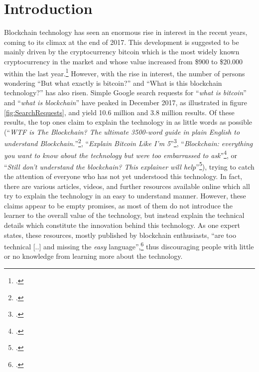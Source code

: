 \chapter{Introduction}
\label{chapter:Intro}

Blockchain technology has seen an enormous rise in interest in the recent years, coming to its climax at the end of 2017. This development is suggested to be mainly driven by the cryptocurrency bitcoin which is the most widely known cryptocurrency in the market and whose value increased from \$900 to \$20.000 within the last year.\footcite[Cf.][]{Higgins900200002017}
However, with the rise in interest, the number of persons wondering \enquote{But what exactly is bitcoin?} and \enquote{What is this blockchain technology?} has also risen. Simple Google search requests for \enquote{\textit{what is bitcoin}} and \enquote{\textit{what is blockchain}} have peaked in December 2017, as illustrated in figure \ref{fig:SearchRequests}, and yield 10.6 million and 3.8 million results. Of these results, the top ones claim to explain the technology in as little words as possible (\enquote{\textit{WTF is The Blockchain?
The ultimate 3500-word guide in plain English to understand Blockchain.}}\footcite{MamoriaWTFBlockchain2017}, \enquote{\textit{Explain Bitcoin Like I'm 5}}\footcite{CustodioExplainBitcoinFive2013}, \enquote{\textit{Blockchain: everything you want to know about the technology but were too embarrassed to ask}}\footcite{HeathmannBlockchaineverythingyou2018}, or \enquote{\textit{Still don't understand the blockchain? This explainer will help}}\footcite{LeighSinodStilldonunderstand2018}), trying to catch the attention of everyone who has not yet understood this technology. In fact, there are various articles, videos, and further resources available online which all try to explain the technology in an easy to understand manner. However, these claims appear to be empty promises, as most of them do not introduce the learner to the overall value of the technology, but instead explain the technical details which constitute the innovation behind this technology. As one expert states, these resources, mostly published by blockchain enthusiasts, \enquote{are too technical [..] and missing the \textit{easy} language},\footcite[Cf.][P19, P20]{DanielKaltenbach_Interview} thus discouraging people with little or no knowledge from learning more about the technology.


